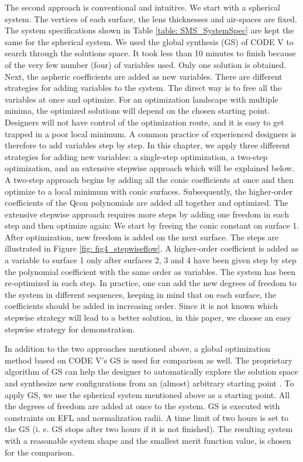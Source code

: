 The second approach is conventional and intuitive. We start with a spherical system. The vertices of each surface, the lens thicknesses and air-spaces are fixed. The system specifications shown in Table \ref{table: SMS_SystemSpec} are kept the same for the spherical system. We used the global synthesis (GS) of CODE V to search through the solutions space. It took less than 10 minutes to finish because of the very few number (four) of variables used. Only one solution is obtained. Next, the aspheric coefficients are added as new variables. There are different strategies for adding variables to the system. The direct way is to free all the variables at once and optimize. For an optimization landscape with multiple minima, the optimized solutions will depend on the chosen starting point. Designers will not have control of the optimization route, and it is easy to get trapped in a poor local minimum. A common practice of experienced designers is therefore to add variables step by step. In this chapter, we apply three different strategies for adding new variables: a single-step optimization, a two-step optimization, and an extensive stepwise approach which will be explained below. A two-step approach begins by adding all the conic coefficients at once and then optimize to a local minimum with conic surfaces. Subsequently, the higher-order coefficients of the Qcon polynomials are added all together and optimized. The extensive stepwise approach requires more steps by adding one freedom in each step and then optimize again: We start by freeing the conic constant on surface 1. After optimization, new freedom is added on the next surface. The steps are illustrated in Figure \ref{fig: fig4_stepwiseflow}. A higher-order coefficient is added as a variable to surface 1 only after surfaces 2, 3 and 4 have been given step by step the polynomial coefficient with the same order as variables. The system has been re-optimized in each step. In practice, one can add the new degrees of freedom to the system in different sequences, keeping in mind that on each surface, the coefficients should be added in increasing order. Since it is not known which stepwise strategy will lead to a better solution, in this paper, we choose an easy stepwise strategy for demonstration.  

In addition to the two approaches mentioned above, a global optimization method based on CODE V’s GS is used for comparison as well. The proprietary algorithm of GS can help the designer to automatically explore the solution space and synthesize new configurations from an (almost) arbitrary starting point \cite{codevmanual}. To apply GS, we use the spherical system mentioned above as a starting point. All the degrees of freedom are added at once to the system. GS is executed with constraints on EFL and normalization radii. A time limit of two hours is set to the GS (i. e. GS stops after two hours if it is not finished). The resulting system with a reasonable system shape and the smallest merit function value, is chosen for the comparison. 

